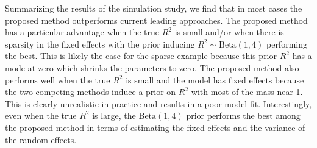 \documentclass[12pt]{article}
\begin{document}
Summarizing the results of the simulation study, we find that in most cases the proposed method outperforms current leading approaches. The proposed method has a particular advantage when the true $R^2$ is small and/or when there is sparsity in the fixed effects with the prior inducing $R^2\sim\mbox{Beta}(1,4)$ performing the best. This is likely the case for the sparse example because this prior $R^2$ has a mode at zero which shrinks the parameters to zero. The proposed method also performs well when the true $R^2$ is small and the model has fixed effects because the two competing methods induce a prior on $R^2$ with most of the mass near 1. This is clearly unrealistic in practice and results in a poor model fit. Interestingly, even when the true $R^2$ is large, the $\mbox{Beta}(1,4)$ prior performs the best among the proposed method in terms of estimating the fixed effects and the variance of the random effects.
\end{document}
